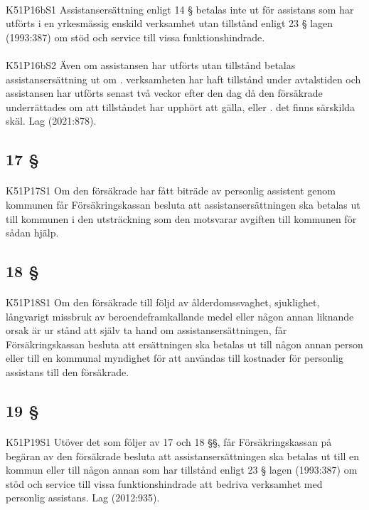 \documentclass[a4paper,notitlepage,openany,10pt]{book}
\begin{document}
\paragraph*{}
{\tiny K51P16bS1}
Assistansersättning enligt 14 § betalas inte ut för assistans som har utförts i en yrkesmässig enskild verksamhet utan tillstånd enligt 23 § lagen (1993:387) om stöd och service till vissa funktionshindrade.
\paragraph*{}
{\tiny K51P16bS2}
Även om assistansen har utförts utan tillstånd betalas assistansersättning ut om
. verksamheten har haft tillstånd under avtalstiden och assistansen har utförts senast två veckor efter den dag då den försäkrade underrättades om att tillståndet har upphört att gälla, eller
. det finns särskilda skäl.
Lag (2021:878).
\subsection*{17 §}
\paragraph*{}
{\tiny K51P17S1}
Om den försäkrade har fått biträde av personlig assistent genom kommunen får Försäkringskassan besluta att assistansersättningen ska betalas ut till kommunen i den utsträckning som den motsvarar avgiften till kommunen för sådan hjälp.
\subsection*{18 §}
\paragraph*{}
{\tiny K51P18S1}
Om den försäkrade till följd av ålderdomssvaghet, sjuklighet, långvarigt missbruk av beroendeframkallande medel eller någon annan liknande orsak är ur stånd att själv ta hand om assistansersättningen, får Försäkringskassan besluta att ersättningen ska betalas ut till någon annan person eller till en kommunal myndighet för att användas till kostnader för personlig assistans till den försäkrade.
\subsection*{19 §}
\paragraph*{}
{\tiny K51P19S1}
Utöver det som följer av 17 och 18 §§, får Försäkringskassan på begäran av den försäkrade besluta att assistansersättningen ska betalas ut till en kommun eller till någon annan som har tillstånd enligt 23 § lagen (1993:387) om stöd och service till vissa funktionshindrade att bedriva verksamhet med personlig assistans.
Lag (2012:935).
\end{document}
